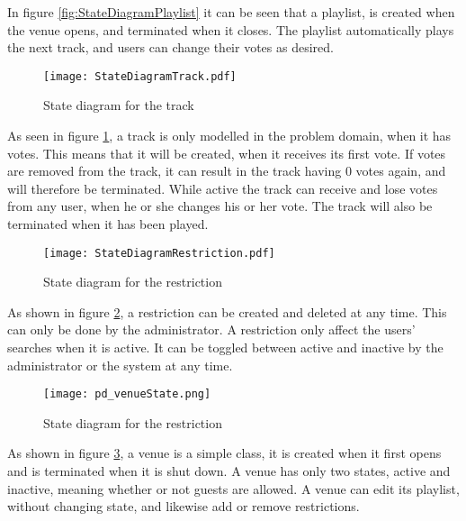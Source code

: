 In figure \cref{fig:StateDiagramPlaylist} it can be seen that a playlist, is created when the venue opens, and terminated when it closes. The playlist automatically plays the next track, and users can change their votes as desired.

\begin{figure}[h!]
  \centering
  \texttt{[image: StateDiagramTrack.pdf]}
  \caption{State diagram for the track}\label{fig:StateDiagramTrack}
\end{figure}

As seen in figure \cref{fig:StateDiagramTrack}, a track is only modelled in the problem domain, when it has votes. This means that it will be created, when it receives its first vote. If votes are removed from the track, it can result in the track having 0 votes again, and will therefore be terminated. While active the track can receive and lose votes from any user, when he or she changes his or her vote. The track will also be terminated when it has been played.

\begin{figure}[h!]
  \centering
  \texttt{[image: StateDiagramRestriction.pdf]}
  \caption{State diagram for the restriction}\label{fig:StateDiagramRestriction}
\end{figure}

As shown in figure \cref{fig:StateDiagramRestriction}, a restriction can be created and deleted at any time. This can only be done by the administrator. A restriction only affect the users' searches when it is active. It can be toggled between active and inactive by the administrator or the system at any time.

\begin{figure}[h!]
  \centering
  \texttt{[image: pd\_venueState.png]}
  \caption{State diagram for the restriction}\label{fig:StateDiagramVenue}
\end{figure}

As shown in figure \cref{fig:StateDiagramVenue}, a venue is a simple class, it is created when it first opens and is terminated when it is shut down. A venue has only two states, active and inactive, meaning whether or not guests are allowed. A venue can edit its playlist, without changing state, and likewise add or remove restrictions.